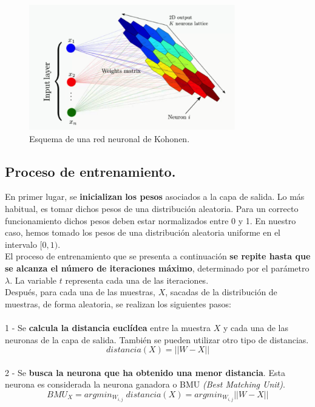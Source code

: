 \begin{figure}
\centering
\includegraphics[width=0.8\textwidth]{imagenes/arquitectura_som.png}

\caption{Esquema de una red neuronal de Kohonen.}
\end{figure}

\subsection{Proceso de entrenamiento.}

En primer lugar, se \textbf{inicializan} \textbf{los pesos} asociados a la capa de salida. Lo más habitual, es tomar dichos pesos de una distribución aleatoria.
Para un correcto funcionamiento dichos pesos deben estar normalizados entre 0 y 1. En nuestro caso, hemos tomado los pesos de una distribución aleatoria uniforme en el intervalo $[0, 1)$.\\

El proceso de entrenamiento que se presenta a continuación \textbf{se repite hasta que se alcanza el número de iteraciones máximo}, determinado por el parámetro $\lambda$. La variable $t$ representa cada una de las iteraciones.\\

Después, para cada una de las muestras, $X$, sacadas de la distribución de muestras, de forma aleatoria, se realizan los siguientes pasos: \\\\
1 - Se \textbf{calcula la distancia euclídea} entre la muestra $X$ y cada una de las neuronas de la capa de salida. También se pueden utilizar otro tipo de distancias.\\
$$distancia(X) = || W - X ||$$\\
2 - Se \textbf{busca la neurona que ha obtenido una menor distancia}. Esta neurona es considerada la neurona ganadora o BMU \textit{(Best Matching Unit)}.\\
$$BMU_X = argmin_{W_{i, j}} \; distancia(X) = argmin_{W_{i, j}} || W - X ||$$\\

